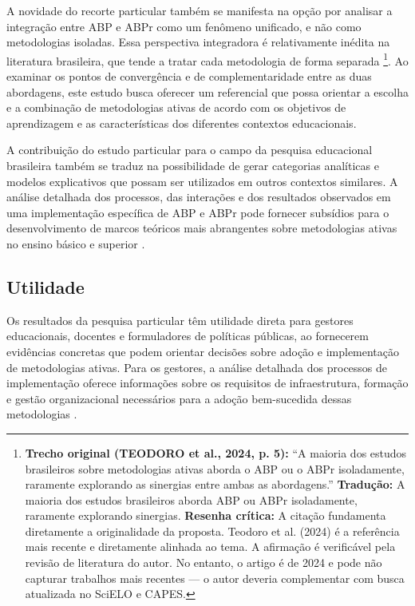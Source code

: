 A novidade do recorte particular também se manifesta na opção por analisar a integração entre ABP e ABPr como um fenômeno unificado, e não como metodologias isoladas. Essa perspectiva integradora é relativamente inédita na literatura brasileira, que tende a tratar cada metodologia de forma separada \cite{TEODORO2024}\footnote{\textbf{Trecho original (TEODORO et al., 2024, p. 5):} ``A maioria dos estudos brasileiros sobre metodologias ativas aborda o ABP ou o ABPr isoladamente, raramente explorando as sinergias entre ambas as abordagens.'' \textbf{Tradução:} A maioria dos estudos brasileiros aborda ABP ou ABPr isoladamente, raramente explorando sinergias. \textbf{Resenha crítica:} A citação fundamenta diretamente a originalidade da proposta. Teodoro et al. (2024) é a referência mais recente e diretamente alinhada ao tema. A afirmação é verificável pela revisão de literatura do autor. No entanto, o artigo é de 2024 e pode não capturar trabalhos mais recentes — o autor deveria complementar com busca atualizada no SciELO e CAPES.}. Ao examinar os pontos de convergência e de complementaridade entre as duas abordagens, este estudo busca oferecer um referencial que possa orientar a escolha e a combinação de metodologias ativas de acordo com os objetivos de aprendizagem e as características dos diferentes contextos educacionais.

A contribuição do estudo particular para o campo da pesquisa educacional brasileira também se traduz na possibilidade de gerar categorias analíticas e modelos explicativos que possam ser utilizados em outros contextos similares. A análise detalhada dos processos, das interações e dos resultados observados em uma implementação específica de ABP e ABPr pode fornecer subsídios para o desenvolvimento de marcos teóricos mais abrangentes sobre metodologias ativas no ensino básico e superior \cite{SANTOS2024}.

\subsection{Utilidade}
\label{subsec:jp_utilidade}

Os resultados da pesquisa particular têm utilidade direta para gestores educacionais, docentes e formuladores de políticas públicas, ao fornecerem evidências concretas que podem orientar decisões sobre adoção e implementação de metodologias ativas. Para os gestores, a análise detalhada dos processos de implementação oferece informações sobre os requisitos de infraestrutura, formação e gestão organizacional necessários para a adoção bem-sucedida dessas metodologias \cite{OLIVEIRA2023}.

